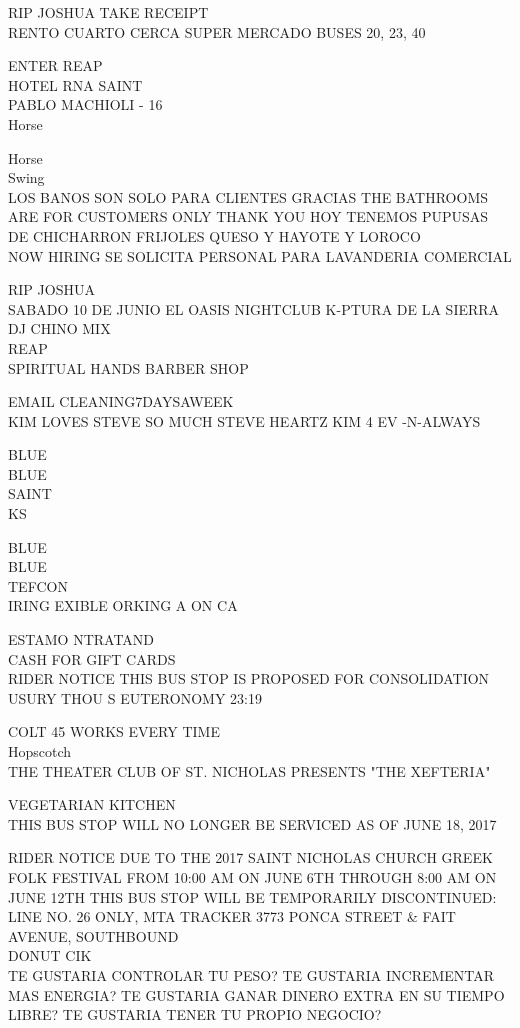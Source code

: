 \documentclass[10pt,letterpaper]{article}
\begin{document}
RIP JOSHUA TAKE RECEIPT\\
RENTO CUARTO CERCA SUPER MERCADO BUSES 20, 23, 40

ENTER REAP\\
HOTEL RNA SAINT\\
PABLO MACHIOLI {-} 16\\
Horse

Horse\\
Swing\\
LOS BANOS SON SOLO PARA CLIENTES GRACIAS THE BATHROOMS ARE FOR CUSTOMERS ONLY THANK YOU HOY TENEMOS PUPUSAS DE CHICHARRON FRIJOLES QUESO Y HAYOTE Y LOROCO\\
NOW HIRING SE SOLICITA PERSONAL PARA LAVANDERIA COMERCIAL

RIP JOSHUA\\
SABADO 10 DE JUNIO EL OASIS NIGHTCLUB K{-}PTURA DE LA SIERRA DJ CHINO MIX\\
REAP\\
SPIRITUAL HANDS BARBER SHOP

EMAIL CLEANING7DAYSAWEEK\\
KIM LOVES STEVE SO MUCH STEVE HEARTZ KIM 4 EV {-}N{-}ALWAYS

BLUE\\
BLUE\\
SAINT\\
KS

BLUE\\
BLUE\\
TEFCON\\
IRING EXIBLE ORKING A ON CA

ESTAMO NTRATAND\\
CASH FOR GIFT CARDS\\
RIDER NOTICE THIS BUS STOP IS PROPOSED FOR CONSOLIDATION\\
USURY THOU S EUTERONOMY 23:19

COLT 45 WORKS EVERY TIME\\
Hopscotch\\
THE THEATER CLUB OF ST. NICHOLAS PRESENTS "THE XEFTERIA"

VEGETARIAN KITCHEN\\
THIS BUS STOP WILL NO LONGER BE SERVICED AS OF JUNE 18, 2017

RIDER NOTICE DUE TO THE 2017 SAINT NICHOLAS CHURCH GREEK FOLK FESTIVAL FROM 10:00 AM ON JUNE 6TH THROUGH 8:00 AM ON JUNE 12TH THIS BUS STOP WILL BE TEMPORARILY DISCONTINUED: LINE NO. 26 ONLY, MTA TRACKER 3773 PONCA STREET \& FAIT AVENUE, SOUTHBOUND\\
DONUT CIK\\
TE GUSTARIA CONTROLAR TU PESO?  TE GUSTARIA INCREMENTAR MAS ENERGIA?  TE GUSTARIA GANAR DINERO EXTRA EN SU TIEMPO LIBRE?  TE GUSTARIA TENER TU PROPIO NEGOCIO?
\end{document}
